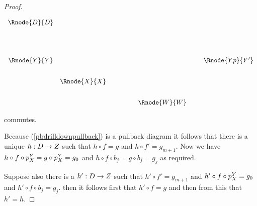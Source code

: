 \documentclass[10pt,a4paper]{scrartcl}
\begin{document}
\begin{proof}
\begin{center}
\begin{displaymath}
\begin{array}{c c p{1.0cm} c p{0.2cm}c}
  \Rnode{D}{D} & &                       & &  &                  \\ [1.6cm]
  \Rnode{Y}{Y} & &                       & &  & \Rnode{Yp}{Y'}   \\ [0.7cm]
	             &  \Rnode{X}{X} & &  &                  \\ [0.7cm]
	             & &                       & \Rnode{W}{W} & & 
\end{array} 
\end{displaymath}
\end{center}

commutes.

Because (\ref{pbdrilldownpullback}) is a pullback diagram  it follows that there is a unique $h:D \rightarrow Z$
such that $h \circ f=g$ and $h \circ f'=g_{m+1}$.
\noindent
Now we have $h \circ f \circ p^{Y}_{X}= g \circ p^{Y}_{X}=g_0$
and $h \circ f \circ b_j = g \circ b_j = g_j$ as required.

\noindent
Suppose also there is a $h' :D \rightarrow Z$ such that
$h' \circ f' =g_{m+1}$
and
$h' \circ f\circ p^{Y}_{X}=g_0$
and 
$h' \circ f \circ b_j=g_j$.
then it follows first that $h' \circ f=g$ and then from this that $h'=h$. 

\end{proof}
\end{document}
